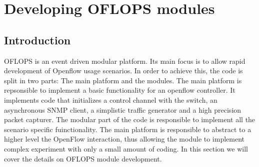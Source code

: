 \documentclass{book}
\begin{document}
%
%
%

\chapter{Developing OFLOPS modules}

\section{Introduction}

OFLOPS is an event driven modular platform. Its main focus is to allow rapid development
of Openflow usage scenarios. In order to achieve this, the code is split in two parts: The main 
platform and the modules. The main platform is repsonsible to implement a basic functionality for an
openflow controller. It implements code that initializes a  control channel with the switch,
an asynchronous SNMP client, a simplistic traffic generator and a high
precision packet capturer. The modular part of the code is responsible to
implement all the scenario specific fuinctionality. The main platform is responsible to abstract to a higher
level the OpenFlow interaction, thus allowing the module  to implement complex
experiment with only a small amount of coding. In this section we will cover
the details on OFLOPS module development.
\end{document}
